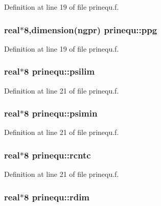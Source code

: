 Definition at line 19 of file prinequ.f.\hypertarget{namespaceprinequ_d9209d25e3945dd8a3d16e06dd159380}{
\subsubsection[ppg]{\setlength{\rightskip}{0pt plus 5cm}real$\ast$8,dimension(ngpr) {\bf prinequ::ppg}}}
\label{namespaceprinequ_d9209d25e3945dd8a3d16e06dd159380}




Definition at line 19 of file prinequ.f.\hypertarget{namespaceprinequ_05b4c9c9a512ba7b68c5d65d9ce3b41b}{
\subsubsection[psilim]{\setlength{\rightskip}{0pt plus 5cm}real$\ast$8 {\bf prinequ::psilim}}}
\label{namespaceprinequ_05b4c9c9a512ba7b68c5d65d9ce3b41b}




Definition at line 21 of file prinequ.f.\hypertarget{namespaceprinequ_5c8e4bf1504c7b93d7ff84932c976a15}{
\subsubsection[psimin]{\setlength{\rightskip}{0pt plus 5cm}real$\ast$8 {\bf prinequ::psimin}}}
\label{namespaceprinequ_5c8e4bf1504c7b93d7ff84932c976a15}




Definition at line 21 of file prinequ.f.\hypertarget{namespaceprinequ_83e3bb5db3b95a0d14bd1261dbc323ab}{
\subsubsection[rcntc]{\setlength{\rightskip}{0pt plus 5cm}real$\ast$8 {\bf prinequ::rcntc}}}
\label{namespaceprinequ_83e3bb5db3b95a0d14bd1261dbc323ab}




Definition at line 21 of file prinequ.f.\hypertarget{namespaceprinequ_abf70da38478de9db7c738b09c099027}{
\subsubsection[rdim]{\setlength{\rightskip}{0pt plus 5cm}real$\ast$8 {\bf prinequ::rdim}}}
\label{namespaceprinequ_abf70da38478de9db7c738b09c099027}




